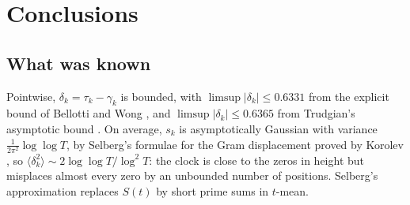 \documentclass[preprint,12pt]{elsarticle}
\numberwithin{equation}{section}
\theoremstyle{plain}
\theoremstyle{definition}
\theoremstyle{remark}
\begin{document}
\section{Conclusions}
\label{sec:conclusions}

\subsection{What was known}
Pointwise, $\delta_k=\tau_k-\gamma_k$ is bounded, with $\limsup|\delta_k|\le0.6331$ from the explicit bound of Bellotti and Wong \cite{BellottiWong2025}, and $\limsup|\delta_k|\le0.6365$ from Trudgian's asymptotic bound \cite{Trudgian2010}. On average, $s_k$ is asymptotically Gaussian with variance $\frac1{2\pi^2}\log\log T$, by Selberg's formulae for the Gram displacement proved by Korolev \cite{KorolevIzv2012,KorolevPIM2012}, so $\langle\delta_k^2\rangle\sim2\log\log T/\log^2T$: the clock is close to the zeros in height but misplaces almost every zero by an unbounded number of positions. Selberg's approximation \cite{Selberg1946a,Fujii1974} replaces $S(t)$ by short prime sums in $t$-mean.
\end{document}
